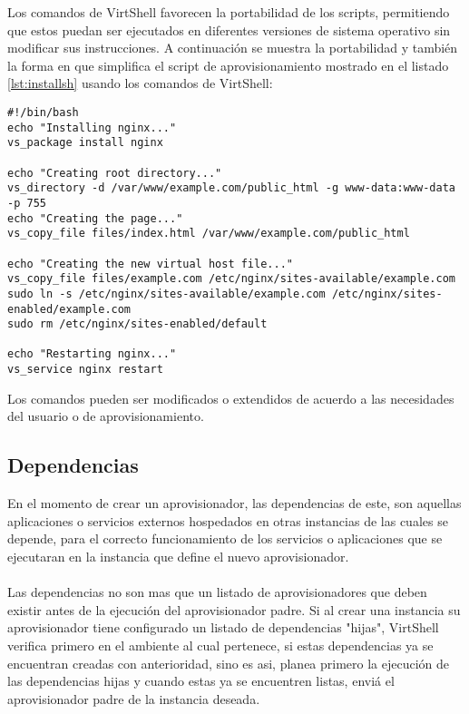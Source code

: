 Los comandos de VirtShell favorecen la portabilidad de los scripts, permitiendo que estos puedan ser ejecutados en diferentes versiones de sistema operativo sin modificar sus instrucciones. A continuación se muestra la portabilidad y también la forma en que simplifica el script de aprovisionamiento mostrado en el listado \ref{lst:installsh} usando los comandos de VirtShell:

\vspace{5mm}

\begin{lstlisting}[style=json, caption=Ejemplo de un script shell usando los comandos de VirtShell]
#!/bin/bash
echo "Installing nginx..."
vs_package install nginx

echo "Creating root directory..."
vs_directory -d /var/www/example.com/public_html -g www-data:www-data -p 755
echo "Creating the page..."
vs_copy_file files/index.html /var/www/example.com/public_html

echo "Creating the new virtual host file..."
vs_copy_file files/example.com /etc/nginx/sites-available/example.com
sudo ln -s /etc/nginx/sites-available/example.com /etc/nginx/sites-enabled/example.com
sudo rm /etc/nginx/sites-enabled/default

echo "Restarting nginx..."
vs_service nginx restart
\end{lstlisting}

\vspace{5mm}

Los comandos pueden ser modificados o extendidos de acuerdo a las necesidades del usuario o de aprovisionamiento.

\subsection{Dependencias}
En el momento de crear un aprovisionador, las dependencias de este, son aquellas aplicaciones o servicios externos hospedados en otras instancias de las cuales se depende, para el correcto funcionamiento de los servicios o aplicaciones que se ejecutaran en la instancia que define el nuevo aprovisionador.\\
\\
Las dependencias no son mas que un listado de aprovisionadores que deben existir antes de la ejecución del aprovisionador padre. Si al crear una instancia su aprovisionador tiene configurado un listado de dependencias "hijas", VirtShell verifica primero en el ambiente al cual pertenece, si estas dependencias ya se encuentran creadas con anterioridad, sino es asi, planea primero la ejecución de las dependencias hijas y cuando estas ya se encuentren listas, enviá el aprovisionador padre de la instancia deseada.

